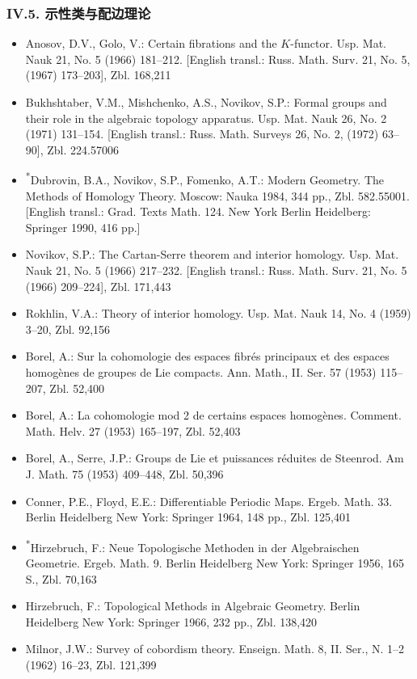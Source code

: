 \subsubsection*{IV.5. 示性类与配边理论}

\begin{itemize}
\item Anosov, D.V., Golo, V.: Certain fibrations and the $K$-functor. Usp. Mat. Nauk 21, No. 5 (1966) 181--212. [English transl.: Russ. Math. Surv. 21, No. 5, (1967) 173--203], Zbl. 168,211
\item Bukhshtaber, V.M., Mishchenko, A.S., Novikov, S.P.: Formal groups and their role in the algebraic topology apparatus. Usp. Mat. Nauk 26, No. 2 (1971) 131--154. [English transl.: Russ. Math. Surveys 26, No. 2, (1972) 63--90], Zbl. 224.57006
\item \textsuperscript{*}Dubrovin, B.A., Novikov, S.P., Fomenko, A.T.: Modern Geometry. The Methods of Homology Theory. Moscow: Nauka 1984, 344 pp., Zbl. 582.55001. [English transl.: Grad. Texts Math. 124. New York Berlin Heidelberg: Springer 1990, 416 pp.]
\item Novikov, S.P.: The Cartan-Serre theorem and interior homology. Usp. Mat. Nauk 21, No. 5 (1966) 217--232. [English transl.: Russ. Math. Surv. 21, No. 5 (1966) 209--224], Zbl. 171,443
\item Rokhlin, V.A.: Theory of interior homology. Usp. Mat. Nauk 14, No. 4 (1959) 3--20, Zbl. 92,156
\item Borel, A.: Sur la cohomologie des espaces fibrés principaux et des espaces homogènes de groupes de Lie compacts. Ann. Math., II. Ser. 57 (1953) 115--207, Zbl. 52,400
\item Borel, A.: La cohomologie mod 2 de certains espaces homogènes. Comment. Math. Helv. 27 (1953) 165--197, Zbl. 52,403
\item Borel, A., Serre, J.P.: Groups de Lie et puissances réduites de Steenrod. Am J. Math. 75 (1953) 409--448, Zbl. 50,396
\item Conner, P.E., Floyd, E.E.: Differentiable Periodic Maps. Ergeb. Math. 33. Berlin Heidelberg New York: Springer 1964, 148 pp., Zbl. 125,401
\item \textsuperscript{*}Hirzebruch, F.: Neue Topologische Methoden in der Algebraischen Geometrie. Ergeb. Math. 9. Berlin Heidelberg New York: Springer 1956, 165 S., Zbl. 70,163
\item Hirzebruch, F.: Topological Methods in Algebraic Geometry. Berlin Heidelberg New York: Springer 1966, 232 pp., Zbl. 138,420
\item Milnor, J.W.: Survey of cobordism theory. Enseign. Math. 8, II. Ser., N. 1--2 (1962) 16--23, Zbl. 121,399

\end{itemize}
